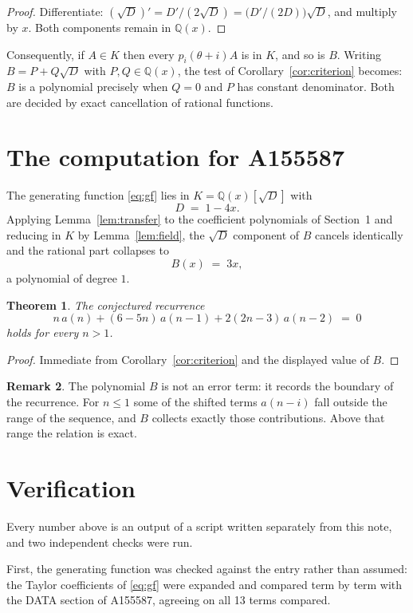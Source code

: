 \documentclass[11pt,a4paper]{article}
\theoremstyle{plain}
\newtheorem{theorem}{Theorem}
\theoremstyle{definition}
\newtheorem{remark}[theorem]{Remark}
\begin{document}
\begin{proof}
Differentiate: $(\sqrt{D})'=D'/(2\sqrt{D})=\bigl(D'/(2D)\bigr)\sqrt{D}$, and multiply by
$x$. Both components remain in $\mathbb{Q}(x)$.
\end{proof}

Consequently, if $A\in K$ then every $p_{i}(\theta+i)A$ is in $K$, and so is $B$. Writing
$B=P+Q\sqrt{D}$ with $P,Q\in\mathbb{Q}(x)$, the test of Corollary~\ref{cor:criterion}
becomes: $B$ is a polynomial precisely when $Q=0$ and $P$ has constant denominator. Both
are decided by exact cancellation of rational functions.

\section{The computation for A155587}

The generating function \eqref{eq:gf} lies in $K=\mathbb{Q}(x)[\sqrt{D}]$ with
\[
D \;=\; 1 - 4 x .
\]
Applying Lemma~\ref{lem:transfer} to the coefficient polynomials of Section~1 and reducing
in $K$ by Lemma~\ref{lem:field}, the $\sqrt{D}$ component of $B$ cancels identically and
the rational part collapses to
\[
B(x)\;=\;3 x ,
\]
a polynomial of degree $1$.

\begin{theorem}
The conjectured recurrence
\[
n\,a(n) + (6 - 5 n)\,a(n-1) + 2 \left(2 n - 3\right)\,a(n-2) \;=\;0
\]
holds for every $n>1$.
\end{theorem}

\begin{proof}
Immediate from Corollary~\ref{cor:criterion} and the displayed value of $B$.
\end{proof}

\begin{remark}
The polynomial $B$ is not an error term: it records the boundary of the recurrence. For
$n\le1$ some of the shifted terms $a(n-i)$ fall outside the range of the sequence,
and $B$ collects exactly those contributions. Above that range the relation is exact.
\end{remark}

\section{Verification}

Every number above is an output of a script written separately from this note, and two
independent checks were run.

First, the generating function was checked against the entry rather than assumed: the
Taylor coefficients of \eqref{eq:gf} were expanded and compared term by term with the DATA
section of A155587, agreeing on all 13 terms compared.
\end{document}
